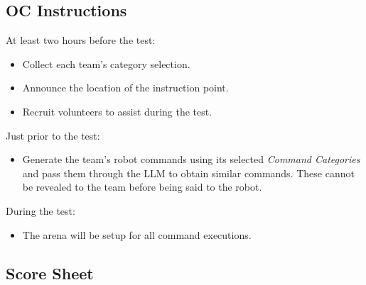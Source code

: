 \subsection*{OC Instructions}

At least two hours before the test:
\begin{itemize}[nosep]
	\item Collect each team's category selection.
	\item Announce the location of the instruction point.
	\item Recruit volunteers to assist during the test.
\end{itemize}

\noindent Just prior to the test:
\begin{itemize}[nosep]
	\item Generate the team's robot commands using its selected \textit{Command Categories} and pass them through the LLM to obtain similar commands. These cannot be revealed to the team before being said to the robot.
\end{itemize}

\noindent During the test:
\begin{itemize}[nosep]
	\item The arena will be setup for all command executions.
\end{itemize}

\subsection*{Score Sheet}


